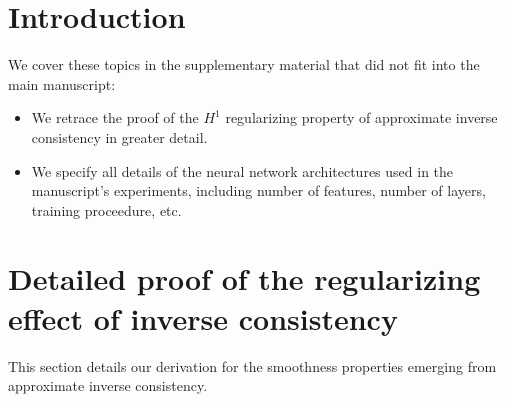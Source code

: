 
\section*{Introduction}
We cover these topics in the supplementary material that did not fit into the main manuscript:
\begin{itemize}
\item We retrace the proof of the $H^1$ regularizing property of approximate inverse consistency in greater detail.
\item We specify all details of the neural network architectures used in the manuscript's experiments, including number of features, number of layers, training proceedure, etc.
\end{itemize}

\section{Detailed proof of the regularizing effect of inverse consistency}

This section details our derivation for the smoothness properties emerging from approximate inverse consistency. 


